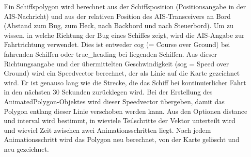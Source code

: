 Ein Schiffspolygon wird berechnet aus der Schiffsposition (Positionsangabe in der AIS-Nachricht) und aus der relativen Position des AIS-Transceivers an Bord (Abstand zum Bug, zum Heck, nach Backbord und nach Steuerbord). Um zu wissen, in welche Richtung der Bug eines Schiffes zeigt, wird die AIS-Angabe zur Fahrtrichtung verwendet. Dies ist entweder cog (= Course over Ground) bei fahrenden Schiffen oder true\_heading bei liegenden Schiffen. Aus dieser Richtungsangabe und der übermittelten Geschwindigkeit (sog = Speed over Ground) wird ein Speedvector berechnet, der als Linie auf die Karte gezeichnet wird. Er ist genauso lang wie die Strecke, die das Schiff bei kontinuierlicher Fahrt in den nächsten 30 Sekunden zurücklegen wird. Bei der Erstellung des AnimatedPolygon-Objektes wird dieser Speedvector übergeben, damit das Polygon entlang dieser Linie verschoben werden kann. Aus den Optionen distance und interval wird bestimmt, in wieviele Teilschritte der Vektor unterteilt wird und wieviel Zeit zwischen zwei Animationsschritten liegt. Nach jedem Animationsschritt wird das Polygon neu berechnet, von der Karte gelöscht und neu gezeichnet.



